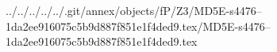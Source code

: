 ../../../../../.git/annex/objects/fP/Z3/MD5E-s4476--1da2ee916075c5b9d887f851e1f4ded9.tex/MD5E-s4476--1da2ee916075c5b9d887f851e1f4ded9.tex